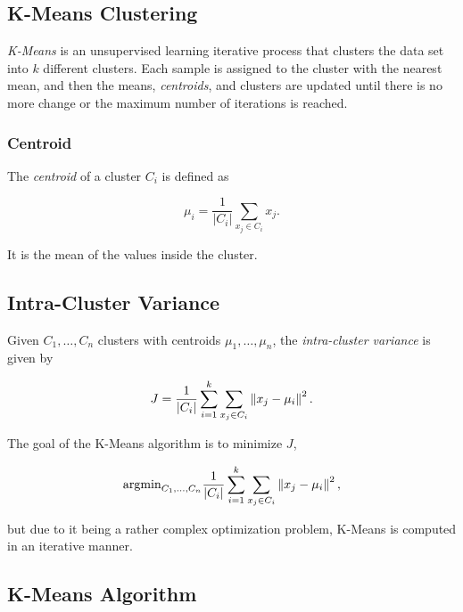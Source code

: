 \subsection{K-Means Clustering}

\emph{K-Means} is an unsupervised learning iterative process that clusters the data set into \(k\) different clusters.
Each sample is assigned to the cluster with the nearest mean, and then the means, \emph{centroids}, and clusters are
updated until there is no more change or the maximum number of iterations is reached.

\subsubsection*{Centroid}

The \emph{centroid} of a cluster \(C_i\) is defined as

\[
	\mu_i = \frac{1}{|C_i|} \sum_{x_j \in C_i} x_j.
\]

It is the mean of the values inside the cluster.

\subsection{Intra-Cluster Variance}

Given \(C_1, \dots, C_n\) clusters with centroids \(\mu_1, \dots, \mu_n\), the \emph{intra-cluster variance} is given by

\[
	J = \frac{1}{|C_i|} \sum_{i = 1}^{k} \sum_{x_j \in C_i} \left\|  x_j - \mu_i \right\|^2.
\]

The goal of the K-Means algorithm is to minimize \(J\),

\[
	\mathrm{argmin}_{C_1, \dots, C_n} \frac{1}{|C_i|} \sum_{i = 1}^{k} \sum_{x_j \in C_i} \left\|  x_j - \mu_i \right\|^2,
\]

but due to it being a rather complex optimization problem, K-Means is computed in an iterative manner.

\subsection{K-Means Algorithm}

